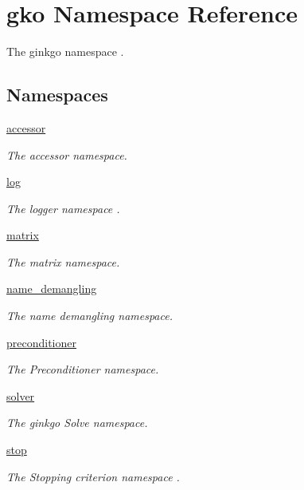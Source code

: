 \hypertarget{namespacegko}{}\section{gko Namespace Reference}
\label{namespacegko}


The ginkgo namespace .  


\subsection*{Namespaces}
\begin{DoxyCompactItemize}
\item 
 \hyperlink{namespacegko_1_1accessor}{accessor}
\begin{DoxyCompactList}\small\item\em The accessor namespace. \end{DoxyCompactList}\item 
 \hyperlink{namespacegko_1_1log}{log}
\begin{DoxyCompactList}\small\item\em The logger namespace . \end{DoxyCompactList}\item 
 \hyperlink{namespacegko_1_1matrix}{matrix}
\begin{DoxyCompactList}\small\item\em The matrix namespace. \end{DoxyCompactList}\item 
 \hyperlink{namespacegko_1_1name__demangling}{name\+\_\+demangling}
\begin{DoxyCompactList}\small\item\em The name demangling namespace. \end{DoxyCompactList}\item 
 \hyperlink{namespacegko_1_1preconditioner}{preconditioner}
\begin{DoxyCompactList}\small\item\em The Preconditioner namespace. \end{DoxyCompactList}\item 
 \hyperlink{namespacegko_1_1solver}{solver}
\begin{DoxyCompactList}\small\item\em The ginkgo Solve namespace. \end{DoxyCompactList}\item 
 \hyperlink{namespacegko_1_1stop}{stop}
\begin{DoxyCompactList}\small\item\em The Stopping criterion namespace . \end{DoxyCompactList}\item 

\end{DoxyCompactItemize}
